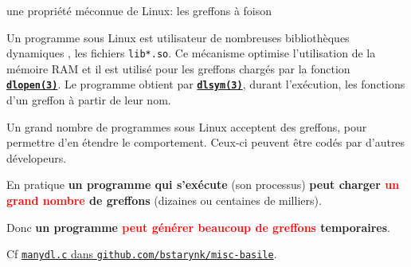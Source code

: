 \documentclass[final,a4]{beamer}
\begin{document}
 \begin{frame}{une propriété méconnue de Linux: les greffons à foison}


   Un programme sous Linux est {}
   utilisateur de nombreuses bibliothèques dynamiques
   {}, les fichiers
   \texttt{lib*.so}. Ce mécanisme optimise l'utilisation de la mémoire
   RAM et il est utilisé pour les greffons
   {} chargés par la fonction
   \textbf{\texttt{\href{https://man7.org/linux/man-pages/man3/dlopen.3.html}{dlopen(3)}}}. Le
   programme obtient par
   \textbf{\texttt{\href{https://man7.org/linux/man-pages/man3/dlsym.3.html}{dlsym(3)}}},
   durant l'exécution, les fonctions d'un greffon à partir de leur nom.

   \medskip
     
   Un grand nombre de programmes sous Linux {} acceptent des greffons,
   pour permettre d'en étendre le comportement. Ceux-ci peuvent être
   codés par d'autres dévelopeurs.

   \bigskip

   En pratique \textbf{un programme qui s'exécute} (son processus)
   \textbf{peut charger \textcolor{red}{un grand nombre} de greffons}
   (dizaines ou centaines de milliers).

   Donc \textbf{un programme \textcolor{red}{peut générer beaucoup de greffons}
     temporaires}.

   \smallskip

   \small{Cf
   \href{https://github.com/bstarynk/misc-basile/blob/master/manydl.c}{\texttt{manydl.c}
     dans \texttt{github.com/bstarynk/misc-basile}}.}

 \end{frame}
\end{document}
